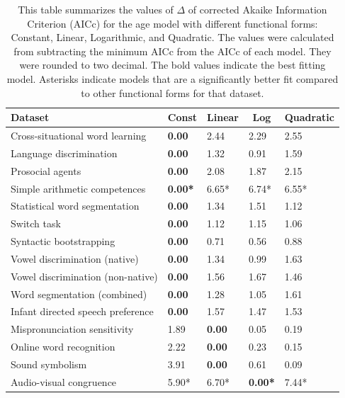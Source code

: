 \documentclass[
  man]{apa6}
\begin{document}
\begin{table}[hbt]
\ifnextchar[{\eatarg}{}
[tbp]

\begin{center}
\begin{threeparttable}

\caption{\label{tab:unnamed-chunk-10} This table summarizes the values of $\Delta$ of corrected Akaike Information Criterion (AICc) for the age model with different functional forms: Constant, Linear, Logarithmic, and Quadratic. The values were calculated from subtracting the minimum AICc from the AICc of each model. They were rounded to two decimal. The bold values indicate the best fitting model. Asterisks indicate models that are a significantly better fit compared to other functional forms for that dataset.}

\begin{tabular}{lllll}
\toprule
Dataset & \multicolumn{1}{c}{Const} & \multicolumn{1}{c}{Linear} & \multicolumn{1}{c}{Log} & \multicolumn{1}{c}{Quadratic}\\
\midrule
Cross-situational word learning & \bf{0.00} & 2.44 & 2.29 & 2.55\\
Language discrimination & \bf{0.00} & 1.32 & 0.91 & 1.59\\
Prosocial agents & \bf{0.00} & 2.08 & 1.87 & 2.15\\
Simple arithmetic competences & \bf{0.00*} & 6.65* & 6.74* & 6.55*\\
Statistical word segmentation & \bf{0.00} & 1.34 & 1.51 & 1.12\\
Switch task & \bf{0.00} & 1.12 & 1.15 & 1.06\\
Syntactic bootstrapping & \bf{0.00} & 0.71 & 0.56 & 0.88\\
Vowel discrimination (native) & \bf{0.00} & 1.34 & 0.99 & 1.63\\
Vowel discrimination (non-native) & \bf{0.00} & 1.56 & 1.67 & 1.46\\
Word segmentation (combined) & \bf{0.00} & 1.28 & 1.05 & 1.61\\
Infant directed speech preference & \bf{0.00} & 1.57 & 1.47 & 1.53\\
Mispronunciation sensitivity & 1.89 & \bf{0.00} & 0.05 & 0.19\\
Online word recognition & 2.22 & \bf{0.00} & 0.23 & 0.15\\
Sound symbolism & 3.91 & \bf{0.00} & 0.61 & 0.09\\
Audio-visual congruence & 5.90* & 6.70* & \bf{0.00*} & 7.44*\\

\end{tabular}
\end{threeparttable}
\end{center}
\end{table}
\end{document}

